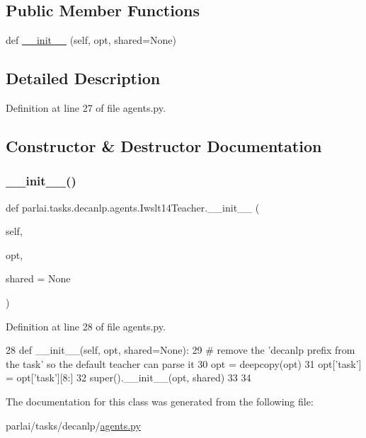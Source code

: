 \subsection*{Public Member Functions}
\begin{DoxyCompactItemize}
\item 
def \hyperlink{classparlai_1_1tasks_1_1decanlp_1_1agents_1_1Iwslt14Teacher_ab5be25b3d68b4bbaa180c280c67a7946}{\+\_\+\+\_\+init\+\_\+\+\_\+} (self, opt, shared=None)
\end{DoxyCompactItemize}


\subsection{Detailed Description}


Definition at line 27 of file agents.\+py.



\subsection{Constructor \& Destructor Documentation}
\mbox{\label{classparlai_1_1tasks_1_1decanlp_1_1agents_1_1Iwslt14Teacher_ab5be25b3d68b4bbaa180c280c67a7946}} 
\subsubsection{\texorpdfstring{\+\_\+\+\_\+init\+\_\+\+\_\+()}{\_\_init\_\_()}}
{\footnotesize\ttfamily def parlai.\+tasks.\+decanlp.\+agents.\+Iwslt14\+Teacher.\+\_\+\+\_\+init\+\_\+\+\_\+ (\begin{DoxyParamCaption}\item[{}]{self,  }\item[{}]{opt,  }\item[{}]{shared = {\ttfamily None} }\end{DoxyParamCaption})}



Definition at line 28 of file agents.\+py.


\begin{DoxyCode}
28     \textcolor{keyword}{def }\_\_init\_\_(self, opt, shared=None):
29         \textcolor{comment}{# remove the 'decanlp prefix from the task' so the default teacher can parse it}
30         opt = deepcopy(opt)
31         opt[\textcolor{stringliteral}{'task'}] = opt[\textcolor{stringliteral}{'task'}][8:]
32         super().\_\_init\_\_(opt, shared)
33 
34 
\end{DoxyCode}


The documentation for this class was generated from the following file\+:\begin{DoxyCompactItemize}
\item 
parlai/tasks/decanlp/\hyperlink{parlai_2tasks_2decanlp_2agents_8py}{agents.\+py}\end{DoxyCompactItemize}

